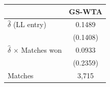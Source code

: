 \begin{tabular}{lc}
\toprule
 & GS-WTA \\
\midrule
$\hat{\delta}$ (LL entry) & 0.1489 \\
 & (0.1408) \\
$\hat{\delta}$ $\times$ Matches won & 0.0933 \\
 & (0.2359) \\
\midrule
Matches & 3,715 \\
\bottomrule
\end{tabular}
